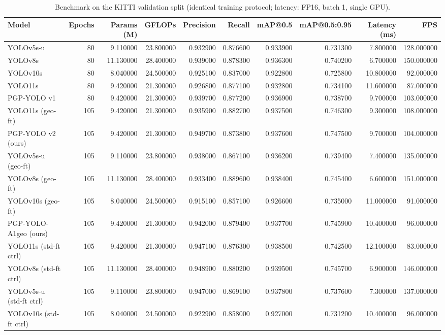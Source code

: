 \begin{table}
\caption{Benchmark on the KITTI validation split (identical training protocol; latency: FP16, batch 1, single GPU).}
\label{tab:benchmark}
\begin{tabular}{lrrrrrrrrr}
\toprule
Model & Epochs & Params (M) & GFLOPs & Precision & Recall & mAP@0.5 & mAP@0.5:0.95 & Latency (ms) & FPS \\
\midrule
YOLOv5s-u & 80 & 9.110000 & 23.800000 & 0.932900 & 0.876600 & 0.933900 & 0.731300 & 7.800000 & 128.000000 \\
YOLOv8s & 80 & 11.130000 & 28.400000 & 0.939000 & 0.878300 & 0.936300 & 0.740200 & 6.700000 & 150.000000 \\
YOLOv10s & 80 & 8.040000 & 24.500000 & 0.925100 & 0.837000 & 0.922800 & 0.725800 & 10.800000 & 92.000000 \\
YOLO11s & 80 & 9.420000 & 21.300000 & 0.926800 & 0.877100 & 0.932800 & 0.734100 & 11.600000 & 87.000000 \\
PGP-YOLO v1 & 80 & 9.420000 & 21.300000 & 0.939700 & 0.877200 & 0.936900 & 0.738700 & 9.700000 & 103.000000 \\
YOLO11s (geo-ft) & 105 & 9.420000 & 21.300000 & 0.935900 & 0.882700 & 0.937500 & 0.746300 & 9.300000 & 108.000000 \\
PGP-YOLO v2 (ours) & 105 & 9.420000 & 21.300000 & 0.949700 & 0.873800 & 0.937600 & 0.747500 & 9.700000 & 104.000000 \\
YOLOv5s-u (geo-ft) & 105 & 9.110000 & 23.800000 & 0.938000 & 0.867100 & 0.936200 & 0.739400 & 7.400000 & 135.000000 \\
YOLOv8s (geo-ft) & 105 & 11.130000 & 28.400000 & 0.933400 & 0.889600 & 0.938400 & 0.745400 & 6.600000 & 151.000000 \\
YOLOv10s (geo-ft) & 105 & 8.040000 & 24.500000 & 0.915100 & 0.857100 & 0.926600 & 0.735000 & 11.000000 & 91.000000 \\
PGP-YOLO-A1geo (ours) & 105 & 9.420000 & 21.300000 & 0.942000 & 0.879400 & 0.937700 & 0.745900 & 10.400000 & 96.000000 \\
YOLO11s (std-ft ctrl) & 105 & 9.420000 & 21.300000 & 0.947100 & 0.876300 & 0.938500 & 0.742500 & 12.100000 & 83.000000 \\
YOLOv8s (std-ft ctrl) & 105 & 11.130000 & 28.400000 & 0.948900 & 0.880200 & 0.939500 & 0.745700 & 6.900000 & 146.000000 \\
YOLOv5s-u (std-ft ctrl) & 105 & 9.110000 & 23.800000 & 0.947000 & 0.869100 & 0.937800 & 0.737600 & 7.300000 & 137.000000 \\
YOLOv10s (std-ft ctrl) & 105 & 8.040000 & 24.500000 & 0.922900 & 0.858000 & 0.927000 & 0.731200 & 10.400000 & 96.000000 \\
\bottomrule
\end{tabular}
\end{table}
